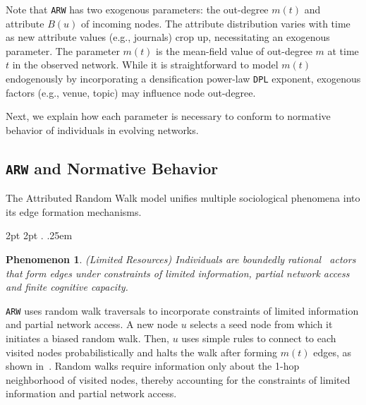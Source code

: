 Note that \texttt{ARW} has two exogenous parameters: the out-degree
$m(t)$ and attribute $B(u)$ of incoming nodes.
The attribute distribution varies with time as new attribute values (e.g., journals) crop up, necessitating an exogenous
parameter. The parameter $m(t)$ is the mean-field value
of out-degree $m$ at time $t$ in the observed network.
While it is straightforward to model $m(t)$
endogenously by incorporating a densification power-law \texttt{DPL} exponent,
exogenous factors (e.g., venue, topic) may influence node out-degree.

Next, we explain how each parameter is necessary to conform to normative
behavior of individuals in evolving networks.

\subsection{\texttt{ARW} and Normative Behavior}
\label{sub:Model Interpretation}
The Attributed Random Walk model unifies multiple sociological phenomena
into its edge formation mechanisms.

  {2pt} %
  {2pt} %
  {\itshape} %
  {} %
  {\bfseries} %
  {.} %
  {.25em} %
  {} %

\theoremstyle{exampstyle} \newtheorem{ph}{Phenomenon}

\begin{ph}
	(Limited Resources) Individuals are boundedly rational~\cite{simon1972theories,gigerenzer1996reasoning,lipman1995information}
	actors that form edges under constraints of limited information, partial network access and finite cognitive capacity.
\end{ph}
\texttt{ARW} uses random walk traversals to incorporate constraints of limited information
and partial network access. A new node $u$ selects a seed node from which it
initiates a biased random walk. Then, $u$ uses simple rules to connect to each visited
nodes probabilistically and halts the walk after forming $m(t)$ edges, as shown in~. Random walks require information only about the
1-hop neighborhood of visited nodes, thereby accounting for  the constraints of limited information and partial network access.


